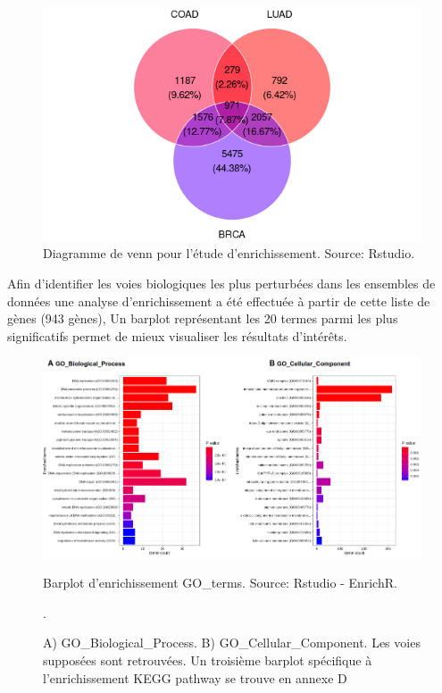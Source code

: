 \documentclass{style}
\begin{document}
\begin{figure}[H]
  \centering
  \includegraphics[width=16cm]{images/figures/venn.png}
  \caption[Diagramme de venn pour l'étude d'enrichissement.]{Diagramme de venn pour l'étude d'enrichissement. Source: Rstudio.}
  \label{fig:venn}
\end{figure}

Afin d’identifier les voies biologiques les plus perturbées dans les ensembles de données une analyse d'enrichissement a été effectuée à partir de cette liste de gènes (943 gènes), Un barplot représentant les 20 termes parmi les plus significatifs permet de mieux visualiser les résultats d'intérêts. \\

\begin{figure}[H]
  \centering
  \includegraphics[width=16cm]{images/figures/enri.png}
  \caption[Barplots d'enrichissement GO\_terms.]{Barplot d'enrichissement GO\_terms. Source: Rstudio - EnrichR.}
  \caption*{A) GO\_Biological\_Process. B) GO\_Cellular\_Component. Les voies supposées sont retrouvées. Un troisième barplot spécifique à l'enrichissement KEGG pathway se trouve en annexe D}.
  \label{fig:enri}
\end{figure}
\end{document}
